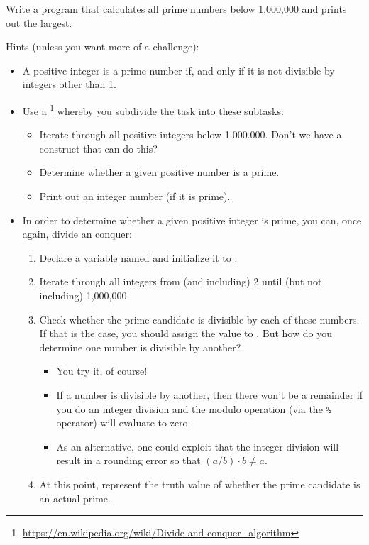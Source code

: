 Write a program that calculates all prime numbers below 1,000,000 and prints out the largest.

Hints (unless you want more of a challenge):
\begin{itemize}
  \item A positive integer is a prime number if, and only if it is not divisible by integers other than 1.
  \item Use a \footnote{\url{https://en.wikipedia.org/wiki/Divide-and-conquer_algorithm}} whereby you subdivide the task into these subtasks:
    \begin{itemize}
      \item Iterate through all positive integers below 1.000.000. Don't we have a construct that can do this?
      \item Determine whether a given positive number is a prime.
      \item Print out an integer number (if it is prime).
    \end{itemize}
  \item In order to determine whether a given positive integer is prime, you can, once again, divide an conquer:
    \begin{enumerate}
      \item Declare a  variable named  and initialize it to .
      \item Iterate through all integers from (and including) 2 until (but not including) 1,000,000.
      \item Check whether the prime candidate is divisible by each of these numbers. If that is the case, you should assign the  value to . But how do you determine one number is divisible by another?
        \begin{itemize}
          \item You try it, of course!
          \item If a number is divisible by another, then there won't be a remainder if you do an integer division and the modulo operation (via the \texttt{\%} operator) will evaluate to zero.
          \item As an alternative, one could exploit that the integer division will result in a rounding error so that $(a/b) \cdot b \neq a$.
        \end{itemize}
      \item At this point,  represent the truth value of whether the prime candidate is an actual prime.
    \end{enumerate}
\end{itemize}

